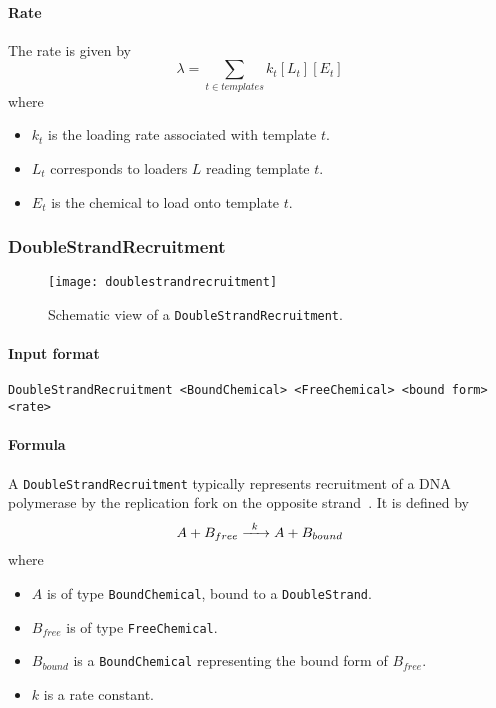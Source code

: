\paragraph{Rate}
The rate is given by
\[
\lambda = \sum_{t\in templates} k_t[L_t][E_t]
\]
where
\begin{itemize}
	\item $k_t$ is the loading rate associated with template $t$.
	\item $L_t$ corresponds to loaders $L$ reading template $t$.
	\item $E_t$ is the chemical to load onto template $t$.
\end{itemize}


\subsubsection{DoubleStrandRecruitment}

\begin{figure}[!h]
  \centering
  \texttt{[image: doublestrandrecruitment]}
  \caption{Schematic view of a \texttt{DoubleStrandRecruitment}.}
\label{fig:double_strand_recruitment}
\end{figure}

\paragraph{Input format}
\begin{verbatim}
DoubleStrandRecruitment <BoundChemical> <FreeChemical> <bound form> <rate>
\end{verbatim}

\paragraph{Formula}
A \texttt{DoubleStrandRecruitment} typically represents recruitment
of a DNA polymerase by the replication fork
on the opposite strand~.
It is defined by
\[
\reactionIrr{A + B_{free}}{A + B_{bound}}{k}{}
\]
where
\begin{itemize}
  \item $A$ is of type \texttt{BoundChemical}, bound to a \texttt{DoubleStrand}.
  \item $B_{free}$ is of type \texttt{FreeChemical}.
  \item $B_{bound}$ is a \texttt{BoundChemical} representing the bound form of $B_{free}$.
  \item $k$ is a rate constant.
\end{itemize}

